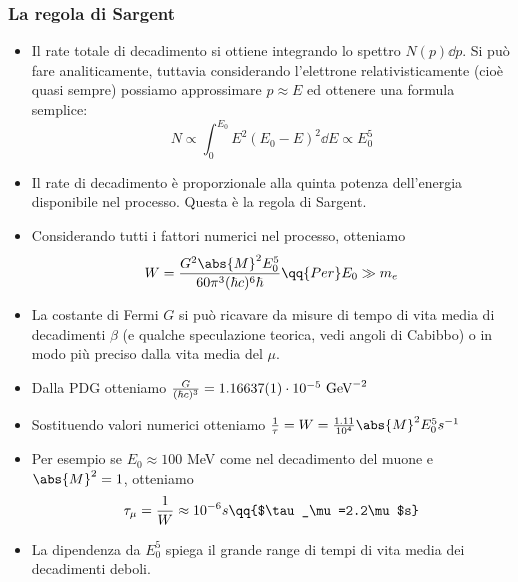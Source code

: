 \subsubsection{La regola di Sargent}
\begin{itemize}
    \item Il rate totale di decadimento si ottiene integrando lo spettro $N(p)\dd{p}$. Si può fare analiticamente, tuttavia considerando l'elettrone relativisticamente (cioè quasi sempre) possiamo approssimare $p\approx E$ ed ottenere una formula semplice:
    \begin{equation*}
    N\propto\int_{0}^{E_0}E^2(E_0-E)^2\dd{E}\propto E_0^5
    \end{equation*}
    \item Il rate di decadimento è proporzionale alla quinta potenza dell'energia disponibile nel processo. Questa è la regola di Sargent. 
    \item Considerando tutti i fattori numerici nel processo, otteniamo 
    \begin{equation*}
        W=\frac{G^2\abs{M}^2E_0^5}{60\pi^3(\hbar c)^6\hbar}\qq{Per }E_0\gg m_e
    \end{equation*}
    \item La costante di Fermi $G$ si può ricavare da misure di tempo di vita media di decadimenti $\beta$ (e qualche speculazione teorica, vedi angoli di Cabibbo) o in modo più preciso dalla vita media del $\mu$.
    \item Dalla PDG otteniamo $\frac{G}{(\hbar c)^3}=1.16637(1)\cdot10^{-5}\textnormal{ GeV}^{-2}$
    \item Sostituendo valori numerici otteniamo $\frac{1}{\tau}=W=\frac{1.11}{10^4}\abs{M}^2E_0^5s^{-1}$
    \item Per esempio se $E_0\approx100$ MeV come nel decadimento del muone e $\abs{M}^2=1$, otteniamo
    \begin{equation*}
    \tau_\mu=\frac{1}{W}\approx10^{-6}s\qq{$\tau_\mu=2.2\mu$s}
    \end{equation*}
    \item La dipendenza da $E_0^5$ spiega il grande range di tempi di vita media dei decadimenti deboli.
\end{itemize}
